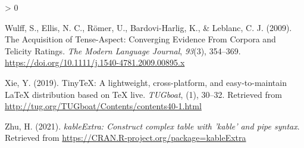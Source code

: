\documentclass[
  english,
  man]{apa6}
\newlength{\cslhangindent}
\newenvironment{CSLReferences}[2] %
 {%
  \setlength{\parindent}{0pt}
  \ifodd #1 \everypar{\setlength{\hangindent}{\cslhangindent}}\ignorespaces\fi
  \ifnum #2 > 0
  \setlength{\parskip}{#2\baselineskip}
  \fi
 }%
 {}
\begin{document}
\begin{CSLReferences}{1}{0}
\leavevmode\hypertarget{ref-wulff_acquisition_2009}{}%
Wulff, S., Ellis, N. C., Römer, U., Bardovi-Harlig, K., \& Leblanc, C. J. (2009). The {Acquisition} of {Tense}-{Aspect}: {Converging} {Evidence} {From} {Corpora} and {Telicity} {Ratings}. \emph{The Modern Language Journal}, \emph{93}(3), 354--369. \url{https://doi.org/10.1111/j.1540-4781.2009.00895.x}

\leavevmode\hypertarget{ref-R-tinytex}{}%
Xie, Y. (2019). TinyTeX: A lightweight, cross-platform, and easy-to-maintain LaTeX distribution based on TeX live. \emph{TUGboat}, (1), 30--32. Retrieved from \url{http://tug.org/TUGboat/Contents/contents40-1.html}

\leavevmode\hypertarget{ref-R-kableExtra}{}%
Zhu, H. (2021). \emph{kableExtra: Construct complex table with 'kable' and pipe syntax}. Retrieved from \url{https://CRAN.R-project.org/package=kableExtra}

\end{CSLReferences}


\clearpage
\makeatletter
\efloat@restorefloats
\makeatother
\end{document}
